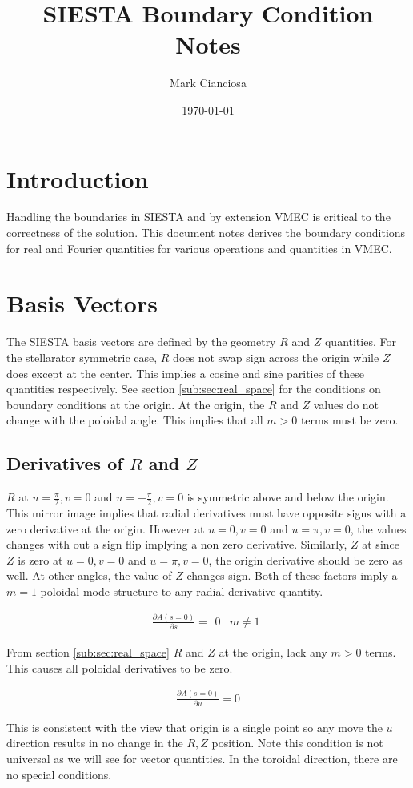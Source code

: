 \documentclass[11pt]{article}
\title{SIESTA Boundary Condition Notes}
\author{Mark Cianciosa}
\date{\today}
\newcommand{\brackets}[1]{\left(#1\right)}
\newcommand{\pd}[2]{\frac{\partial#1}{\partial#2}}
\newcommand{\equ}[2]{
	\begin{equation}
    \begin{split}
	#1
	\label{#2}
	\end{split}
	\end{equation}
}
\begin{document}
\maketitle

\tableofcontents

\section{Introduction}
Handling the boundaries in SIESTA and by extension VMEC is critical to the correctness of the solution. 
This document notes derives the boundary conditions for real and Fourier quantities for various operations and quantities in VMEC.

\section{Basis Vectors}
The SIESTA basis vectors are defined by the geometry $R$ and $Z$ quantities. 
For the stellarator symmetric case, $R$ does not swap sign across the origin while $Z$ does except at the center.
This implies a cosine and sine parities of these quantities respectively.
See section \ref{sub:sec:real_space} for the conditions on boundary conditions at the origin.
At the origin, the $R$ and $Z$ values do not change with the poloidal angle.
This implies that all $m>0$ terms must be zero.

\subsection{Derivatives of $R$ and $Z$}
$R$ at $u=\frac{\pi}{2},v=0$ and $u=-\frac{\pi}{2},v=0$ is symmetric above and below the origin.
This mirror image implies that radial derivatives must have opposite signs with a zero derivative at the origin.
However at $u=0,v=0$ and $u=\pi,v=0$, the values changes with out a sign flip implying a non zero derivative.
Similarly, $Z$ at since $Z$ is zero at $u=0,v=0$ and $u=\pi,v=0$, the origin derivative should be zero as well.
At other angles, the value of $Z$ changes sign.
Both of these factors imply a $m=1$ poloidal mode structure to any radial derivative quantity.
\equ{
\pd{A\brackets{s=0}}{s}=
\begin{array}{lr}
0 & m\ne1
\end{array}
}{equ:dads}

From section \ref{sub:sec:real_space} $R$ and $Z$ at the origin, lack any $m>0$ terms.
This causes all poloidal derivatives to be zero.
\equ{
\pd{A\brackets{s=0}}{u}=0
}{equ:dadu}
This is consistent with the view that origin is a single point so any move the $u$ direction results in no change in the $R,Z$ position.
Note this condition is not universal as we will see for vector quantities.
In the toroidal direction, there are no special conditions.
\end{document}
